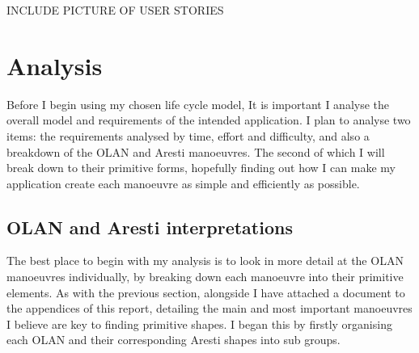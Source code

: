 INCLUDE PICTURE OF USER STORIES

\section{Analysis}
Before I begin using my chosen life cycle model, It is important I analyse the overall model and requirements of the intended application. I plan to analyse two items: the requirements analysed by time, effort and difficulty, and also a breakdown of the OLAN and Aresti manoeuvres. The second of which I will break down to their primitive forms, hopefully finding out how I can make my application create each manoeuvre as simple and efficiently as possible.

\subsection{OLAN and Aresti interpretations}
The best place to begin with my analysis is to look in more detail at the OLAN manoeuvres individually, by breaking down each manoeuvre into their primitive elements. As with the previous section, alongside I have attached a document to the appendices of this report, detailing the main and most important manoeuvres I believe are key to finding primitive shapes. I began this by firstly organising each OLAN and their corresponding Aresti shapes into sub groups. 

